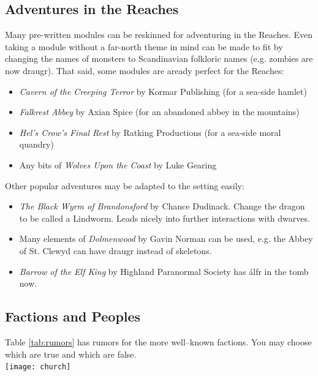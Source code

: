 \documentclass[notitlepage]{article}
\begin{document}
\begin{multicols*}{2}
  \section{Adventures in the Reaches}

  Many pre-written modules can be reskinned for adventuring in the Reaches.
  Even taking a module without a far-north theme in mind can be made to fit by changing the names of monsters to Scandinavian folkloric names (e.g. zombies are now draugr).
  That said, some modules are aready perfect for the Reaches:

  \begin{itemize}
  \item \emph{Cavern of the Creeping Terror} by Kormar Publishing (for a sea-side hamlet)
  \item \emph{Falkrest Abbey} by Axian Spice (for an abandoned abbey in the mountains)
  \item \emph{Hel's Crow's Final Rest} by Ratking Productions (for a sea-side moral quandry)
  \item Any bits of \emph{Wolves Upon the Coast} by Luke Gearing
  \end{itemize}

  Other popular adventures may be adapted to the setting easily:

  \begin{itemize}
  \item \emph{The Black Wyrm of Brandonsford} by Chance Dudinack. Change the dragon to be called a Lindworm. Leads nicely into further interactions with dwarves.
  \item Many elements of \emph{Dolmenwood} by Gavin Norman can be used, e.g. the Abbey of St. Clewyd can have draugr instead of skeletons.
  \item \emph{Barrow of the Elf King} by Highland Paranormal Society has \'alfr in the tomb now.
  \end{itemize}

  
  \subsection*{Factions and Peoples}

  Table \ref{tab:rumors} has rumors for the more well--known factions.
  You may choose which are true and which are false. \\

  {\centering \texttt{[image: church]}}


\end{multicols*}
\end{document}
